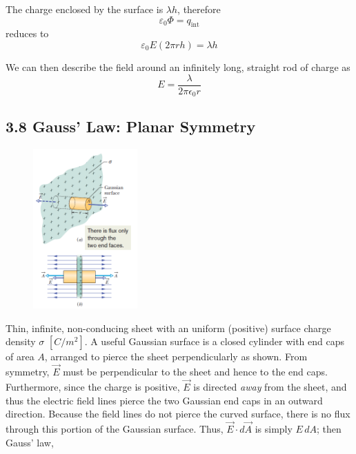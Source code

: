 \documentclass[12pt, a4paper]{article}
\begin{document}
		The charge enclosed by the surface is $\lambda h$, therefore
		\begin{equation*}
			\varepsilon_0 \Phi = q_{\text{int}}
		\end{equation*}
		reduces to
		\begin{equation*}
			\varepsilon_0 E(2\pi rh) = \lambda h
		\end{equation*}
	
		We can then describe the field around an infinitely long, straight rod of charge as
		\begin{equation*}
			E = \frac{\lambda}{2\pi\epsilon_0 r}
			\tag{line of charge, 3-11}
		\end{equation*}
	
		
	
	
		\subsection*{3.8 Gauss' Law: Planar Symmetry}
		
		\begin{figure}
			\centering
			\includegraphics[width=4cm]{Physics2_PNGs/planar-gauss-surf.png}
			\caption*{}
			\label{fig:planar-gauss-surf.png}
		\end{figure}
		
		
		Thin, infinite, non-conducing sheet with an uniform (positive) surface charge density $\sigma$ $[ C/m^2 ]$. A useful Gaussian surface is a closed cylinder with end caps of area $A$, arranged to pierce the sheet perpendicularly as shown. From symmetry, $\vec{E}$ must be perpendicular to the sheet and hence to the end caps. Furthermore, since the charge is positive, $\vec{E}$ is directed \textit{away} from the sheet, and thus the electric field lines pierce the two Gaussian end caps in an outward direction. Because the field lines do not pierce the curved surface, there is no flux through this portion of the Gaussian surface. Thus, $\vec{E} \cdot d\vec{A}$ is simply $E \, dA$; then Gauss’ law,
		
\end{document}
